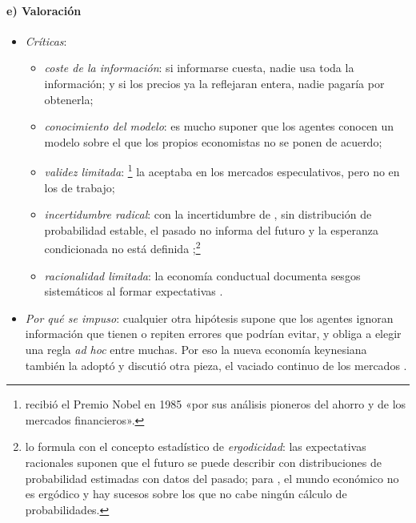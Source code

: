 \documentclass[11pt]{article}
\begin{document}
\paragraph{e) Valoración}

\begin{itemize}
\item \emph{Críticas}:
  \begin{itemize}
  \item \emph{coste de la información}: si informarse cuesta, nadie usa toda la información; y si los precios ya la reflejaran entera, nadie pagaría por obtenerla\nocite{GrossmanStiglitz1980Impossibility};
  \item \emph{conocimiento del modelo}: es mucho suponer que los agentes conocen un modelo sobre el que los propios economistas no se ponen de acuerdo\nocite{Shiller1978Rational};
  \item \emph{validez limitada}: \textcite{Modigliani1977Monetarist}\footnote{ recibió el Premio Nobel en 1985 «por sus análisis pioneros del ahorro y de los mercados financieros»\nocite{Nobel1985Modigliani}.} la aceptaba en los mercados especulativos, pero no en los de trabajo;
  \item \emph{incertidumbre radical}: con la incertidumbre de , sin distribución de probabilidad estable, el pasado no informa del futuro y la esperanza condicionada no está definida\nocite{Davidson1982Rational} ;\footnote{ lo formula con el concepto estadístico de \emph{ergodicidad}: las expectativas racionales suponen que el futuro se puede describir con distribuciones de probabilidad estimadas con datos del pasado; para , el mundo económico no es ergódico y hay sucesos sobre los que no cabe ningún cálculo de probabilidades.}
  \item \emph{racionalidad limitada}: la economía conductual documenta sesgos sistemáticos al formar expectativas .
  \end{itemize}
\item \emph{Por qué se impuso}: cualquier otra hipótesis supone que los agentes ignoran información que tienen o repiten errores que podrían evitar, y obliga a elegir una regla \emph{ad hoc} entre muchas. Por eso la nueva economía keynesiana también la adoptó y discutió otra pieza, el vaciado continuo de los mercados .
\end{itemize}

\end{document}
